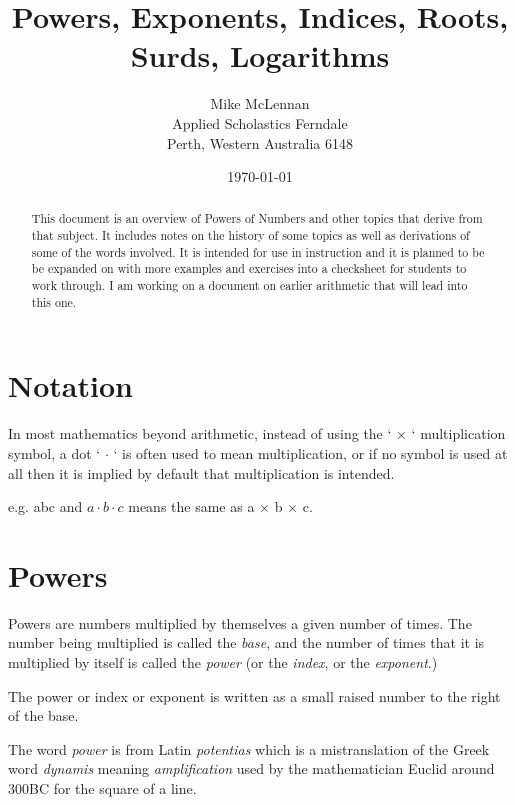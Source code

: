 \documentclass{article}
\begin{document}
	
	\author{Mike McLennan\\
		Applied Scholastics Ferndale\\
		Perth, Western Australia 6148\\}
	\date{\today}
	\title{Powers, Exponents, Indices, Roots, Surds, Logarithms}
	\maketitle

\begin{abstract}
	This document is an overview of Powers of Numbers and other topics that derive from that subject. It includes notes on the history of some topics as well as derivations of some of the words involved. It is intended for use in instruction and it is planned to be be expanded on with more examples and exercises into a checksheet for students to work through. I am working on a document on earlier arithmetic that will lead into this one.
\end{abstract}

\section*{Notation}

In most mathematics beyond arithmetic, instead of using the ‘ × ‘ multiplication symbol, a dot ‘ $\cdot$ ‘ is often used to mean multiplication, or if no symbol is used at all then it is implied by default that multiplication is intended.

e.g.	{abc and ${a\cdot b \cdot c}$ means the same as a $\times$ b $\times$ c.}

\tableofcontents
\newpage

\section{Powers}
Powers are numbers multiplied by themselves a given number of times. The number being multiplied is called the \textit{base}, and the number of times that it is multiplied by itself is called the \textit{power} (or the \textit{index}, or the \textit{exponent}.)

The power or index or exponent is written as a small raised number to the right of the base.

The word \textit{power} is from Latin \textit{potentias} which is a mistranslation of the Greek word \textit{dynamis} meaning \textit{amplification} used by the mathematician Euclid around 300BC for the square of a line.
\end{document}
